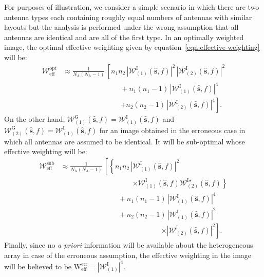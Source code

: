 \documentclass[a4paper,fleqn,usenatbib]{mnras}
\newcommand{\Nant}{N_\textrm{A}}
\begin{document}
For purposes of illustration, we consider a simple scenario in which there are two antenna types each containing roughly equal numbers of antennas with similar layouts but the analysis is performed under the wrong assumption that all antennas are identical and are all of the first type. In an optimally weighted image, the optimal effective weighting given by equation~\ref{eqn:effective-weighting} will be:
\begin{align}\label{eqn:effective-weighting-optimal-example}
  \mathcal{W}_\textrm{eff}^\textrm{opt} &\approx \frac{1}{\Nant(\Nant-1)}\,\left[n_1n_2\,\left|\mathcal{W}^\textrm{I}_{(1)}(\hat{\mathbf{s}},f)\right|^2\,\left|\mathcal{W}^\textrm{I}_{(2)}(\hat{\mathbf{s}},f)\right|^2\right.\nonumber\\
  &\qquad\qquad\qquad\qquad + n_1(n_1-1)\,\left|\mathcal{W}^\textrm{I}_{(1)}(\hat{\mathbf{s}},f)\right|^4 \nonumber\\
  &\qquad\qquad\qquad\qquad \left. + n_2(n_2-1)\,\left|\mathcal{W}^\textrm{I}_{(2)}(\hat{\mathbf{s}},f)\right|^4\right].
\end{align}
On the other hand, $\mathcal{W}^\textrm{G}_{(1)}(\hat{\mathbf{s}},f) = \mathcal{W}^\textrm{I}_{(1)}(\hat{\mathbf{s}},f)$ and $\mathcal{W}^\textrm{G}_{(2)}(\hat{\mathbf{s}},f) = \mathcal{W}^\textrm{I}_{(1)}(\hat{\mathbf{s}},f)$ for an image obtained in the erroneous case in which all antennas are assumed to be identical. It will be sub-optimal whose effective weighting will be:
\begin{align}\label{eqn:effective-weighting-optimal-example}
  \mathcal{W}_\textrm{eff}^\textrm{sub} &\approx \frac{1}{\Nant(\Nant-1)}\,\left[\left\{n_1n_2\,\left|\mathcal{W}^\textrm{I}_{(1)}(\hat{\mathbf{s}},f)\right|^2 \right.\right. \nonumber\\
  &\qquad\qquad\qquad\qquad\qquad \left.\times\mathcal{W}^\textrm{I}_{(1)}(\hat{\mathbf{s}},f)\mathcal{W}^{\textrm{I}\star}_{(2)}(\hat{\mathbf{s}},f)\right\}\nonumber\\
  &\qquad\qquad\qquad\qquad + n_1(n_1-1)\,\left|\mathcal{W}^\textrm{I}_{(1)}(\hat{\mathbf{s}},f)\right|^4 \nonumber\\
  &\qquad\qquad\qquad\qquad + n_2(n_2-1)\,\left|\mathcal{W}^\textrm{I}_{(1)}(\hat{\mathbf{s}},f)\right|^2\nonumber\\
  &\qquad\qquad\qquad\qquad\qquad\qquad\qquad \left.\times\left|\mathcal{W}^\textrm{I}_{(2)}(\hat{\mathbf{s}},f)\right|^2\right].
\end{align}
Finally, since no {\it a priori} information will be available about the heterogeneous array in case of the erroneous assumption, the effective weighting in the image will be believed to be $\mathrm{W}_\textrm{eff}^\textrm{err} = \left|\mathcal{W}_{(1)}^\textrm{I}\right|^4$. 
\end{document}
